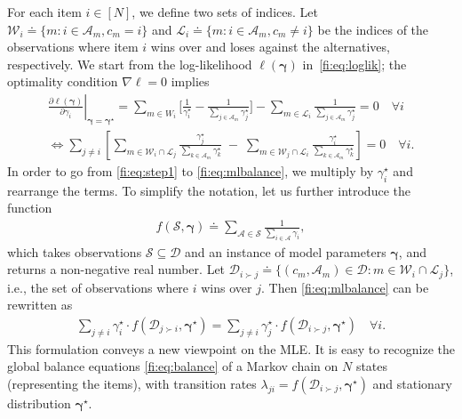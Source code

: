 For each item $i \in [N]$, we define two sets of indices.
Let $\mathcal{W}_i \doteq \{ m : i \in \mathcal{A}_m, c_m = i \}$ and $\mathcal{L}_i \doteq \{ m : i \in \mathcal{A}_m, c_m \ne i \}$ be the indices of the observations where item $i$ wins over and loses against the alternatives, respectively.
We start from the log-likelihood $\ell(\bm{\gamma})$ in~\eqref{fi:eq:loglik};
the optimality condition $\nabla \ell = 0$ implies
\begin{align}
\left. \frac{\partial \ell(\bm{\gamma})}{\partial \gamma_i} \right\rvert_{\bm{\gamma} = \bm{\gamma}^\star}
    = \sum_{m \in W_i} \bigg[ \frac{1}{\gamma^\star_i} - \frac{1}{\sum_{j \in \mathcal{A}_m} \gamma^\star_j} \bigg]
      - \sum_{m \in \mathcal{L}_i} \frac{1}{\sum_{j \in \mathcal{A}_m} \gamma^\star_j} = 0 \quad \forall i \label{fi:eq:step1} \\
\iff  \sum_{j \ne i} \left[
    \sum_{m \in \mathcal{W}_i \cap \mathcal{L}_j} \frac{\gamma^\star_j}{\sum_{k \in \mathcal{A}_m} \gamma^\star_k}
    \;-\; \sum_{m \in \mathcal{W}_j \cap \mathcal{L}_i} \frac{\gamma^\star_i}{\sum_{k \in \mathcal{A}_m} \gamma^\star_k}
    \right] = 0 \quad \forall i. \label{fi:eq:mlbalance}
\end{align}
In order to go from \eqref{fi:eq:step1} to \eqref{fi:eq:mlbalance}, we multiply by $\gamma^\star_i$ and rearrange the terms.
To simplify the notation, let us further introduce the function
\begin{align*}
f(\mathcal{S}, \bm{\gamma}) \doteq \sum_{\mathcal{A} \in \mathcal{S}} \frac{1}{\sum_{i \in \mathcal{A}} \gamma_i},
\end{align*}
which takes observations $\mathcal{S} \subseteq \mathcal{D}$ and an instance of model parameters $\bm{\gamma}$, and returns a non-negative real number.
Let $\mathcal{D}_{i \succ j} \doteq \{ (c_m, \mathcal{A}_m) \in \mathcal{D} : m \in \mathcal{W}_i \cap \mathcal{L}_j \}$, i.e., the set of observations where $i$ wins over $j$.
Then \eqref{fi:eq:mlbalance} can be rewritten as
\begin{align}
\label{fi:eq:master}
\sum_{j \ne i} \gamma^\star_i \cdot f(\mathcal{D}_{j \succ i}, \bm{\gamma}^\star)
= \sum_{j \ne i} \gamma^\star_j \cdot f(\mathcal{D}_{i \succ j}, \bm{\gamma}^\star) \quad \forall i.
\end{align}
This formulation conveys a new viewpoint on the MLE.
It is easy to recognize the global balance equations \eqref{fi:eq:balance} of a Markov chain on $N$ states (representing the items), with transition rates $\lambda_{ji} = f(\mathcal{D}_{i \succ j}, \bm{\gamma}^\star)$ and stationary distribution $\bm{\gamma}^\star$.
